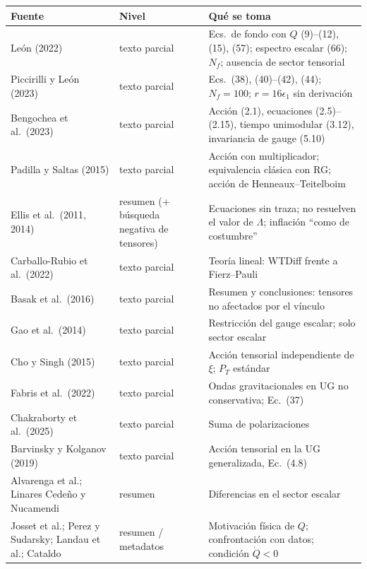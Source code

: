 \begingroup\small
\renewcommand{\arraystretch}{1.2}
\begin{longtable}{@{}L{4.2cm}L{2.6cm}L{7.2cm}@{}}
\toprule
\textbf{Fuente} & \textbf{Nivel} & \textbf{Qué se toma}\\
\midrule
\endhead
León (2022) \cite{leon22} & texto parcial & Ecs.\ de fondo con $Q$ (9)--(12), (15), (57); espectro escalar (66); $N_f$; ausencia de sector tensorial\\
Piccirilli y León (2023) \cite{piccirilli23} & texto parcial & Ecs.\ (38), (40)--(42), (44); $N_f=100$; $r=16\epsilon_1$ sin derivación\\
Bengochea et al.\ (2023) \cite{bengochea23} & texto parcial & Acción (2.1), ecuaciones (2.5)--(2.15), tiempo unimodular (3.12), invariancia de gauge (5.10)\\
Padilla y Saltas (2015) \cite{padilla15} & texto parcial & Acción con multiplicador; equivalencia clásica con RG; acción de Henneaux--Teitelboim\\
Ellis et al.\ (2011, 2014) \cite{ellis11,ellis14} & resumen (+ búsqueda negativa de tensores) & Ecuaciones sin traza; no resuelven el valor de $\Lambda$; inflación ``como de costumbre''\\
Carballo-Rubio et al.\ (2022) \cite{carballo22} & texto parcial & Teoría lineal: WTDiff frente a Fierz--Pauli\\
Basak et al.\ (2016) \cite{basak16} & texto parcial & Resumen y conclusiones: tensores no afectados por el vínculo\\
Gao et al.\ (2014) \cite{gao14} & texto parcial & Restricción del gauge escalar; solo sector escalar\\
Cho y Singh (2015) \cite{cho15} & texto parcial & Acción tensorial independiente de $\xi$; $P_T$ estándar\\
Fabris et al.\ (2022) \cite{fabris22} & texto parcial & Ondas gravitacionales en UG no conservativa; Ec.~(37)\\
Chakraborty et al.\ (2025) \cite{chakraborty25} & texto parcial & Suma de polarizaciones\\
Barvinsky y Kolganov (2019) \cite{barvinsky19} & texto parcial & Acción tensorial en la UG generalizada, Ec.~(4.8)\\
Alvarenga et al.; Linares Cedeño y Nucamendi \cite{alvarenga23,linares23} & resumen & Diferencias en el sector escalar\\
Josset et al.; Perez y Sudarsky; Landau et al.; Cataldo \cite{josset17,perez19,landau23,cataldo26} & resumen / metadatos & Motivación física de $Q$; confrontación con datos; condición $\dot Q<0$\\

\end{longtable}

